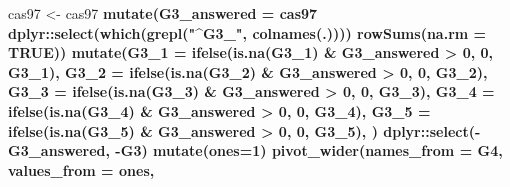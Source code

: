 \documentclass[]{article}
\newenvironment{Shaded}{\begin{snugshade}}{\end{snugshade}}
\newcommand{\DataTypeTok}[1]{\textcolor[rgb]{0.13,0.29,0.53}{#1}}
\newcommand{\DecValTok}[1]{\textcolor[rgb]{0.00,0.00,0.81}{#1}}
\newcommand{\KeywordTok}[1]{\textcolor[rgb]{0.13,0.29,0.53}{\textbf{#1}}}
\newcommand{\NormalTok}[1]{#1}
\newcommand{\OperatorTok}[1]{\textcolor[rgb]{0.81,0.36,0.00}{\textbf{#1}}}
\newcommand{\OtherTok}[1]{\textcolor[rgb]{0.56,0.35,0.01}{#1}}
\newcommand{\StringTok}[1]{\textcolor[rgb]{0.31,0.60,0.02}{#1}}
\begin{document}
\begin{Shaded}
\begin{Highlighting}[]
\NormalTok{cas97 <-}\StringTok{ }\NormalTok{cas97 }\OperatorTok{%
\StringTok{  }\KeywordTok{mutate}\NormalTok{(}\DataTypeTok{G3_answered =}\NormalTok{ cas97 }\OperatorTok{%
\StringTok{                        }\NormalTok{dplyr}\OperatorTok{::}\KeywordTok{select}\NormalTok{(}\KeywordTok{which}\NormalTok{(}\KeywordTok{grepl}\NormalTok{(}\StringTok{"^G3_"}\NormalTok{, }\KeywordTok{colnames}\NormalTok{(.)))) }\OperatorTok{%
\StringTok{                        }\KeywordTok{rowSums}\NormalTok{(}\DataTypeTok{na.rm =} \OtherTok{TRUE}\NormalTok{)) }\OperatorTok{%
\StringTok{  }\KeywordTok{mutate}\NormalTok{(}\DataTypeTok{G3_1 =} \KeywordTok{ifelse}\NormalTok{(}\KeywordTok{is.na}\NormalTok{(G3_}\DecValTok{1}\NormalTok{) }\OperatorTok{&}\StringTok{ }\NormalTok{G3_answered }\OperatorTok{>}\StringTok{ }\DecValTok{0}\NormalTok{, }\DecValTok{0}\NormalTok{, G3_}\DecValTok{1}\NormalTok{),}
         \DataTypeTok{G3_2 =} \KeywordTok{ifelse}\NormalTok{(}\KeywordTok{is.na}\NormalTok{(G3_}\DecValTok{2}\NormalTok{) }\OperatorTok{&}\StringTok{ }\NormalTok{G3_answered }\OperatorTok{>}\StringTok{ }\DecValTok{0}\NormalTok{, }\DecValTok{0}\NormalTok{, G3_}\DecValTok{2}\NormalTok{),}
         \DataTypeTok{G3_3 =} \KeywordTok{ifelse}\NormalTok{(}\KeywordTok{is.na}\NormalTok{(G3_}\DecValTok{3}\NormalTok{) }\OperatorTok{&}\StringTok{ }\NormalTok{G3_answered }\OperatorTok{>}\StringTok{ }\DecValTok{0}\NormalTok{, }\DecValTok{0}\NormalTok{, G3_}\DecValTok{3}\NormalTok{),}
         \DataTypeTok{G3_4 =} \KeywordTok{ifelse}\NormalTok{(}\KeywordTok{is.na}\NormalTok{(G3_}\DecValTok{4}\NormalTok{) }\OperatorTok{&}\StringTok{ }\NormalTok{G3_answered }\OperatorTok{>}\StringTok{ }\DecValTok{0}\NormalTok{, }\DecValTok{0}\NormalTok{, G3_}\DecValTok{4}\NormalTok{),}
         \DataTypeTok{G3_5 =} \KeywordTok{ifelse}\NormalTok{(}\KeywordTok{is.na}\NormalTok{(G3_}\DecValTok{5}\NormalTok{) }\OperatorTok{&}\StringTok{ }\NormalTok{G3_answered }\OperatorTok{>}\StringTok{ }\DecValTok{0}\NormalTok{, }\DecValTok{0}\NormalTok{, G3_}\DecValTok{5}\NormalTok{),}
\NormalTok{         ) }\OperatorTok{%
\StringTok{  }\NormalTok{dplyr}\OperatorTok{::}\KeywordTok{select}\NormalTok{(}\OperatorTok{-}\NormalTok{G3_answered, }\OperatorTok{-}\NormalTok{G3) }\OperatorTok{%
\StringTok{  }\KeywordTok{mutate}\NormalTok{(}\DataTypeTok{ones=}\DecValTok{1}\NormalTok{) }\OperatorTok{%
\StringTok{  }\KeywordTok{pivot_wider}\NormalTok{(}\DataTypeTok{names_from =}\NormalTok{ G4,}
              \DataTypeTok{values_from =}\NormalTok{ ones,}
}}}}}}}
\end{Highlighting}
\end{Shaded}
\end{document}
